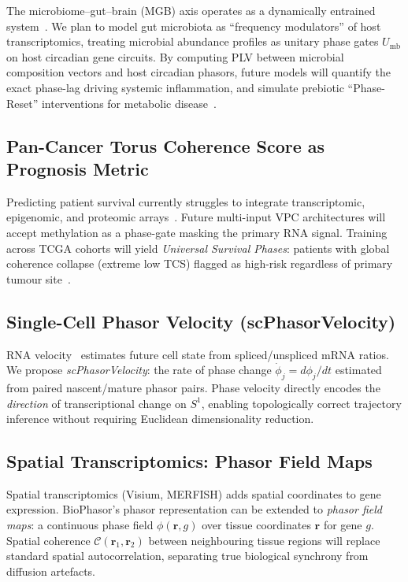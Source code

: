 \documentclass[preprint,12pt,amsmath,amssymb,superscriptaddress,floatfix]{revtex4-2}
\begin{document}
The microbiome--gut--brain (MGB) axis operates as a dynamically entrained
system~\cite{ref_151,ref_152,ref_153}.
We plan to model gut microbiota as ``frequency modulators'' of host
transcriptomics, treating microbial abundance profiles as unitary phase gates
$U_{\mathrm{mb}}$ on host circadian gene circuits.
By computing PLV between microbial composition vectors and host circadian phasors,
future models will quantify the exact phase-lag driving systemic
inflammation, and simulate prebiotic ``Phase-Reset'' interventions for
metabolic disease~\cite{ref_154,ref_155}.

\subsection{Pan-Cancer Torus Coherence Score as Prognosis Metric}

Predicting patient survival currently struggles to integrate transcriptomic,
epigenomic, and proteomic arrays~\cite{ref_156,ref_157}.
Future multi-input VPC architectures will accept methylation as a phase-gate
masking the primary RNA signal.
Training across TCGA cohorts will yield \emph{Universal Survival Phases}:
patients with global coherence collapse (extreme low TCS) flagged as
high-risk regardless of primary tumour site~\cite{ref_158,ref_159}.

\subsection{Single-Cell Phasor Velocity (scPhasorVelocity)}

RNA velocity~\cite{la2018rna} estimates future cell state from
spliced/unspliced mRNA ratios.
We propose \emph{scPhasorVelocity}: the rate of phase change
$\dot{\phi}_j = d\phi_j/dt$ estimated from paired nascent/mature
phasor pairs.
Phase velocity directly encodes the \emph{direction} of transcriptional
change on $S^1$, enabling topologically correct trajectory inference without
requiring Euclidean dimensionality reduction.

\subsection{Spatial Transcriptomics: Phasor Field Maps}

Spatial transcriptomics (Visium, MERFISH) adds spatial coordinates to
gene expression.
BioPhasor's phasor representation can be extended to \emph{phasor field
maps}: a continuous phase field $\phi(\mathbf{r}, g)$ over tissue
coordinates $\mathbf{r}$ for gene $g$.
Spatial coherence $\mathcal{C}(\mathbf{r}_1, \mathbf{r}_2)$ between
neighbouring tissue regions will replace standard spatial autocorrelation,
separating true biological synchrony from diffusion artefacts.
\end{document}
